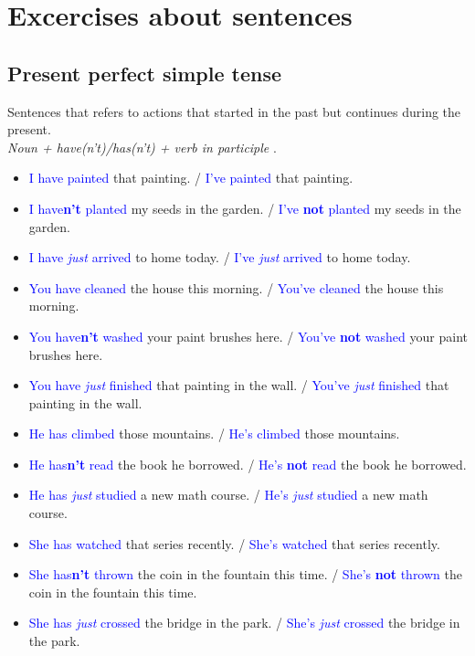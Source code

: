 \section{Excercises about sentences}
\subsection{Present perfect simple tense}
\begin{multicols}{2}
Sentences that refers to actions that started in the past but continues during the present.\\
\emph{Noun + have(n't)/has(n't) + verb in participle }.\\

\begin{itemize}
\item \textcolor{blue}{I have painted} that painting. / \textcolor{blue}{I've painted} that painting.
\item \textcolor{blue}{I have\textbf{n't} planted} my seeds in the garden. / \textcolor{blue}{I've \textbf{not} planted} my seeds in the garden.
\item \textcolor{blue}{I have \emph{just} arrived} to home today. / \textcolor{blue}{I've \emph{just} arrived} to home today.

\item \textcolor{blue}{You have cleaned} the house this morning. / \textcolor{blue}{You've cleaned} the house this morning.
\item \textcolor{blue}{You have\textbf{n't} washed} your paint brushes here. / \textcolor{blue}{You've \textbf{not} washed} your paint brushes here.
\item \textcolor{blue}{You have \emph{just} finished} that painting in the wall. / \textcolor{blue}{You've \emph{just} finished} that painting in the wall.

\item \textcolor{blue}{He has climbed} those mountains. / \textcolor{blue}{He's climbed} those mountains.
\item \textcolor{blue}{He has\textbf{n't} read} the book he borrowed. / \textcolor{blue}{He's \textbf{not} read} the book he borrowed.
\item \textcolor{blue}{He has \emph{just} studied} a new math course. / \textcolor{blue}{He's \emph{just} studied} a new math course.

\item \textcolor{blue}{She has watched} that series recently. / \textcolor{blue}{She's watched} that series recently.
\item \textcolor{blue}{She has\textbf{n't} thrown} the coin in the fountain this time. / \textcolor{blue}{She's \textbf{not} thrown} the coin in the fountain this time.
\item \textcolor{blue}{She has \emph{just} crossed} the bridge in the park. / \textcolor{blue}{She's \emph{just} crossed} the bridge in the park.


\end{itemize}
\end{multicols}
